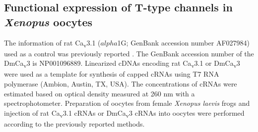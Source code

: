 \subsection*{Functional expression of T-type channels in \emph{Xenopus} oocytes}

The information of rat Ca\textsubscript{v}3.1 ($alpha$1G; GenBank accession number AF027984) used as a control was previously reported \cite{9495342}.
The GenBank accession number of the DmCa\textsubscript{v}3 is NP001096889.
Linearized cDNAs encoding rat Ca\textsubscript{v}3.1 or DmCa\textsubscript{v}3 were used as a template for synthesis of capped cRNAs using T7 RNA polymerase (Ambion, Austin, TX, USA).
The concentrations of cRNAs were estimated based on optical density measured at 260 nm with a spectrophotometer.
Preparation of oocytes from female \emph{Xenopus laevis} frogs and injection of rat Ca\textsubscript{v}3.1 cRNAs or DmCa\textsubscript{v}3 cRNAs into oocytes were performed according to the previously reported methods\cite{16377633}.
    
    
  
